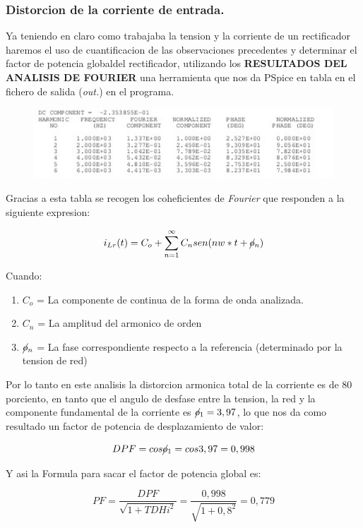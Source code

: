 \documentclass[11pt,a4paper]{article}
\begin{document}
\subsubsection{Distorcion de la corriente de entrada.}
Ya teniendo en claro como trabajaba la tension y la corriente de un rectificador haremos el uso de cuantificacion de las observaciones precedentes y determinar el factor de potencia globaldel rectificador, utilizando los \textbf{RESULTADOS DEL ANALISIS DE FOURIER} una herramienta que nos da PSpice en tabla en el fichero de salida (\emph{out.}) en el programa.\\

\begin{figure}[h]
\centering
\includegraphics[scale=.3]{8.png} 
\end{figure}

Gracias a esta tabla se recogen los coheficientes de \emph{Fourier} que responden a la siguiente expresion:

$$ i_{Lr} (t) = C_{o} + \sum_{n=1}^{\infty} C_{n} sen(nw * t+ \cancel{o}_{n} ) $$

Cuando:\begin{enumerate}
\item $ C_{o} $ = La componente de continua de la forma de onda analizada.
\item $ C_{n} $ = La amplitud del armonico de orden
\item $ \cancel{o}_{n} $ = La fase correspondiente respecto a la referencia (determinado por la tension de red)
\end{enumerate}

Por lo tanto en este analisis la distorcion armonica total de la corriente es de 80 porciento, en tanto que el angulo de desfase entre la tension, la red y la componente fundamental de la corriente es $ \cancel{o}_{1} = 3,97 $, lo que nos da como resultado un factor de potencia de desplazamiento de valor:

$$ DPF = cos\cancel{o}_{1} = cos3,97 = 0,998 $$

Y asi la Formula para sacar el factor de potencia global es:

$$ PF = \dfrac{DPF}{\sqrt{1 + TDHi^2}} = \dfrac{0,998}{\sqrt{1 + 0,8^2}} = 0,779 $$
\end{document}
